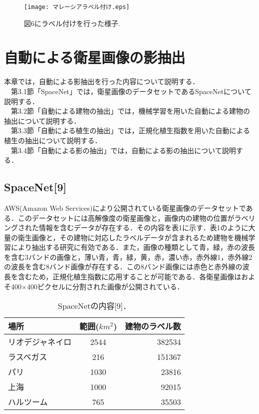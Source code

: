 \documentclass[a4j,twoside,twocolumn]{jarticle}
\begin{document}
\begin{figure}[t]
  \begin{center}
    \texttt{[image: マレーシアラベル付け.eps]}
    \caption{図6にラベル付けを行った様子.}
    \label{fig7}
  \end{center}
\end{figure}

\section{自動による衛星画像の影抽出}
本章では，自動による影抽出を行った内容について説明する．\\
　第3.1節「SpaceNet」では，衛星画像のデータセットであるSpaceNetについて説明する．\\
　第3.2節「自動による建物の抽出」では，機械学習を用いた自動による建物の抽出について説明する．\\
　第3.3節「自動による植生の抽出」では，正規化植生指数を用いた自動による植生の抽出について説明する．\\
　第3.4節「自動による影の抽出」では，自動による影の抽出について説明する．\\

\subsection{SpaceNet[9]}
AWS(Amazon Web Services)により公開されている衛星画像のデータセットである．このデータセットには高解像度の衛星画像と，画像内の建物の位置がラベリングされた情報を含むデータが存在する．その内容を表1に示す．表1のように大量の衛生画像と，その建物に対応したラベルデータが含まれるため建物を機械学習により抽出する研究に有効である．また，画像の種類として青，緑，赤の波長を含む3バンドの画像と，薄い青，青，緑，黄，赤，濃い赤，赤外線1，赤外線2の波長を含む8バンド画像が存在する．この8バンド画像には赤色と赤外線の波長を含むため，正規化植生指数に応用することが可能である．各衛星画像はおよそ400×400ピクセルに分割された画像が公開されている．\\

\begin{table}[hbtp]
  \caption{SpaceNetの内容[9]．}
  \label{table:data_type}
  \centering
  \begin{tabular}{lcr}
    \hline
    場所  & 範囲($km^{2}$) & 建物のラベル数  \\
    \hline \hline
    リオデジャネイロ  & 2544 &  382534 \\
    ラスベガス  & 216  &  151367 \\
    パリ  & 1030  &  23816\\
    上海  &  1000  &  92015 \\
    ハルツーム  &  765  &  35503\\
    \hline
  \end{tabular}
\end{table}
\end{document}
